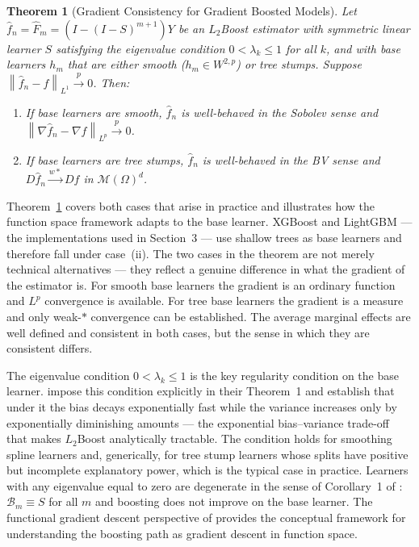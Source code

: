 \documentclass[12pt]{article}
\newtheorem{theorem}{Theorem}
\newcommand{\norm}[1]{\left\| #1 \right\|}
\newcommand{\cM}{\mathcal{M}(\Omega)^d}
\newcommand{\fn}{\hat{f}_n}
\newcommand{\xrightarrowp}{\xrightarrow{p}}
\newcommand{\wstar}{\xrightarrow{w*}}
\begin{document}
	\begin{theorem}[Gradient Consistency for Gradient Boosted Models]
		\label{thm:boosting}
		Let $\fn = \hat{F}_m = (I - (I-S)^{m+1})Y$ be an $L_2$Boost estimator with
		symmetric linear learner $S$ satisfying the eigenvalue condition $0 < \lambda_k \leq
		1$ for all $k$, and with base learners $h_m$ that are either smooth ($h_m \in
		W^{2,p}$) or tree stumps. Suppose $\norm{\fn - f}_{L^1} \xrightarrowp 0$. Then:
		\begin{enumerate}
			\item[(i)] If base learners are smooth, $\fn$ is well-behaved in the Sobolev
			sense and $\norm{\nabla \fn - \nabla f}_{L^p} \xrightarrowp 0$.
			\item[(ii)] If base learners are tree stumps, $\fn$ is well-behaved in the
			BV sense and $D\fn \wstar Df$ in $\cM$.
		\end{enumerate}
	\end{theorem}
	
	Theorem~\ref{thm:boosting} covers both cases that arise in practice and illustrates
	how the function space framework adapts to the base learner. XGBoost and
	LightGBM --- the implementations used in Section~3 --- use shallow trees as base
	learners and therefore fall under case~(ii). The two cases in the theorem are not
	merely technical alternatives --- they reflect a genuine difference in what the
	gradient of the estimator is. For smooth base learners the gradient is an ordinary
	function and $L^p$ convergence is available. For tree base learners the gradient is a
	measure and only weak-$*$ convergence can be established. The average marginal effects
	are well defined and consistent in both cases, but the sense in which they are
	consistent differs.
	
	The eigenvalue condition $0 < \lambda_k \leq 1$ is the key regularity condition on
	the base learner. \citet{buhlmann2003boosting} impose this condition explicitly in
	their Theorem~1 and establish that under it the bias decays exponentially fast while
	the variance increases only by exponentially diminishing amounts --- the exponential
	bias--variance trade-off that makes $L_2$Boost analytically tractable. The condition
	holds for smoothing spline learners and, generically, for tree stump learners whose
	splits have positive but incomplete explanatory power, which is the typical case in
	practice. Learners with any eigenvalue equal to zero are degenerate in the sense of
	Corollary~1 of \citet{buhlmann2003boosting}: $\mathcal{B}_m \equiv S$ for all $m$ and
	boosting does not improve on the base learner. The functional gradient descent
	perspective of \citet{mason2000boosting} provides the conceptual framework for
	understanding the boosting path as gradient descent in function space.
	
\end{document}
